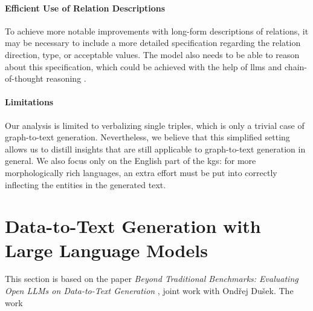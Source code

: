 \paragraph{Efficient Use of Relation Descriptions} To achieve more notable improvements with long-form descriptions of relations, it may be necessary to include a more detailed specification regarding the relation direction, type, or acceptable values. The model also needs to be able to reason about this specification, which could be achieved with the help of \acp{llm} and chain-of-thought reasoning \cite{weiChainThoughtPrompting2022,zhaoInvestigatingTabletoTextGeneration2023}.


\paragraph{Limitations} Our analysis is limited to verbalizing single triples, which is only a trivial case of graph-to-text generation. Nevertheless, we believe that this simplified setting allows us to distill insights that are still applicable to graph-to-text generation in general. We also focus only on the English part of the \acp{kg}: for more morphologically rich languages, an extra effort must be put into correctly inflecting the entities in the generated text.






\section{Data-to-Text Generation with Large Language Models}
\label{sec:quintd}

\begin{refbox}
    This section is based on the paper \emph{Beyond Traditional Benchmarks: Evaluating Open LLMs on Data-to-Text Generation} \cite{kasnerReferenceBasedMetricsAnalyzing2024}, joint work with Ondřej Dušek. The work 
\end{refbox}



